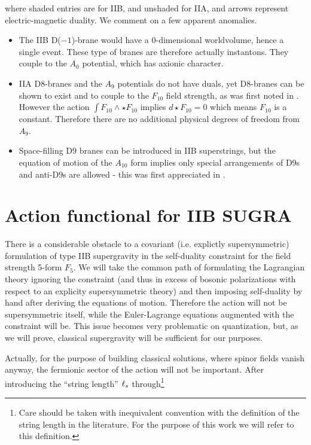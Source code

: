 where shaded entries are for IIB, and unshaded for IIA, and arrows represent electric-magnetic duality. We comment on a few apparent anomalies.

\begin{itemize}
	\item The IIB D($-1$)-brane would have a $0$-dimensional worldvolume, hence a single event. These type of branes are therefore actually instantons. They couple to the $A_0$ potential, which has axionic character.
	\item IIA D$8$-branes and the $A_9$ potentials do not have duals, yet D$8$-branes can be shown to exist and to couple to the $F_{10}$ field strength, as was first noted in \cite{pcA9}. However the action $\int F_{10} \wedge \star F_{10}$ implies $d\star F_{10} = 0$ which means $F_{10}$ is a constant. Therefore there are no additional physical degrees of freedom from $A_9$.
	\item Space-filling D$9$ branes can be introduced in IIB superstrings, but the equation of motion of the $A_{10}$ form implies only special arrangements of D$9$s and anti-D$9$s are allowed - this was first appreciated in \cite{pcA10}.
\end{itemize}


\section{Action functional for IIB SUGRA}\label{sec:sugra}

There is a considerable obstacle to a covariant (i.e. explictly supersymmetric) formulation of type IIB supergravity in the self-duality constraint for the field strength 5-form $F_5$. We will take the common path of formulating the Lagrangian theory ignoring the constraint (and thus in excess of bosonic polarizations with respect to an explicity supersymmetric theory) and then imposing self-duality by hand after deriving the equations of motion. Therefore the action will not be supersymmetric itself, while the Euler-Lagrange equations augmented with the constraint will be. This issue becomes very problematic on quantization, but, as we will prove, classical supergravity will be sufficient for our purposes.

Actually, for the purpose of building classical solutions, where spinor fields vanish anyway, the fermionic sector of the action will not be important. After introducing the ``string length'' $\ell_s$ through\footnote{Care should be taken with inequivalent convention with the definition of the string length in the literature. For the purpose of this work we will refer to this definition.} 

